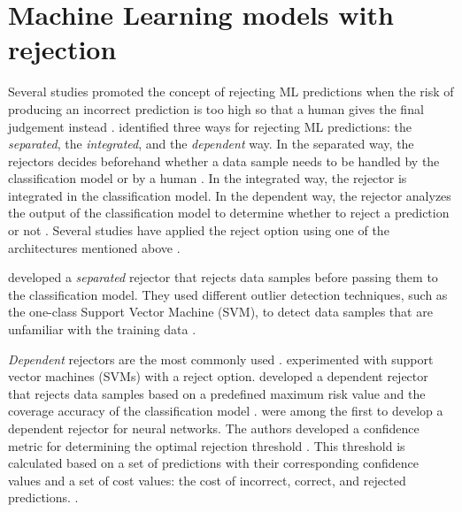 \section{Machine Learning models with rejection}
\label{sec:related-work-rejection}
Several studies promoted the concept of rejecting ML predictions when the risk of producing an incorrect prediction is too high so that a human gives the final judgement instead \citep{sayin2021science, hendrickx2021machine, woo2020future}.
%
\citet{hendrickx2021machine} identified three ways for rejecting ML predictions: the \emph{separated}, the \emph{integrated}, and the \emph{dependent} way.
%
In the separated way, the rejectors decides beforehand whether a data sample needs to be handled by the classification model or by a human \citep{hendrickx2021machine}.
%
In the integrated way, the rejector is integrated in the classification model\citep{hendrickx2021machine}.
%
In the dependent way, the rejector analyzes the output of the classification model to determine whether to reject a prediction or not \citep{hendrickx2021machine}.
%
Several studies have applied the reject option using one of the architectures mentioned above \citep{coenen2020probability, grandvalet2008reject, Geifman2017Selective, geifman2019reject, de2000reject}.
%

%
\citet{coenen2020probability} developed a \emph{separated} rejector that rejects data samples before passing them to the classification model.
%
They used different outlier detection techniques, such as the one-class Support Vector Machine (SVM), to detect data samples that are unfamiliar with
the training data  \citep{coenen2020probability}.
%

%
\emph{Dependent} rejectors are the most commonly used \citep{Geifman2017Selective, de2000reject, grandvalet2008reject}.
%
\citet{grandvalet2008reject} experimented with support vector machines (SVMs) with a reject option.
%
\citet{Geifman2017Selective} developed a dependent rejector that rejects data samples based on a predefined maximum risk value and the coverage accuracy of the classification model \citep{Geifman2017Selective}.
%
\citet{de2000reject} were among the first to develop a dependent rejector for neural networks.
%
The authors developed a confidence metric for determining the optimal rejection threshold \citep{de2000reject}.
%
This threshold is calculated based on a set of predictions with their corresponding confidence values and a set of cost values: the cost of incorrect, correct, and rejected predictions. \citep{de2000reject}.
%

